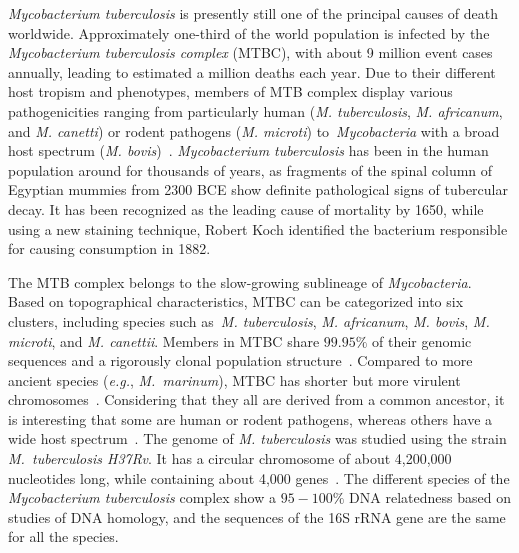 \documentclass[runningheads,a4paper]{llncs}
\begin{document}
\textit{Mycobacterium tuberculosis} is presently still one of the principal causes of death worldwide. Approximately one-third of the world population is infected by the \textit{Mycobacterium tuberculosis complex} (MTBC), with about 9 million event cases annually, leading to estimated a million deaths each year. Due to their different host tropism and phenotypes, members of MTB complex display various pathogenicities ranging from particularly human 
(\textit{M. tuberculosis}, \textit{M. africanum}, and \textit{M. canetti}) or rodent pathogens (\textit{M. microti}) to~\textit{Mycobacteria} with a broad host spectrum (\textit{M. bovis})~\cite{smith2006bottlenecks, shamputa2015introduction, brosch2002new}. 
\textit{Mycobacterium tuberculosis} has been in the human population around for thousands of years, as fragments of the spinal column of Egyptian mummies from 2300 BCE show definite pathological signs of tubercular decay. It has been recognized as the leading cause of mortality by 1650, while using a new staining technique, Robert Koch identified the bacterium responsible for causing consumption in 1882. %

The MTB complex belongs to the slow-growing sublineage of \textit{Mycobacteria}. Based on  topographical characteristics, MTBC can be categorized into six clusters, including species such as~\textit{M. tuberculosis}, \textit{M. africanum},  \textit{M. bovis},  \textit{M. microti}, and \textit{M. canettii}. Members in MTBC share $99.95\%$ of their genomic sequences and a rigorously clonal population structure~\cite{gutacker2002genome}. Compared to more ancient species (\textit{e.g.}, \textit{M.~marinum}), MTBC has shorter but more virulent chromosomes~\cite{mostowy2002genomic,yamada2007mycobacterium}. Considering that they all are derived from a common ancestor, it is interesting that some are human or rodent pathogens, whereas others have a wide host spectrum~\cite{fabre2010molecular}.
The genome of \textit{M. tuberculosis} was studied using the strain 
\textit{M.~tuberculosis H37Rv}. It has a circular chromosome of about 4,200,000 nucleotides long, while containing about 4,000 genes~\cite{fleischmann2002whole}. The different species of the \textit {Mycobacterium tuberculosis} complex show a $95-100\%$ DNA relatedness based on studies of DNA homology, and the sequences of the 16S rRNA gene are the same for all the species. %
\end{document}
